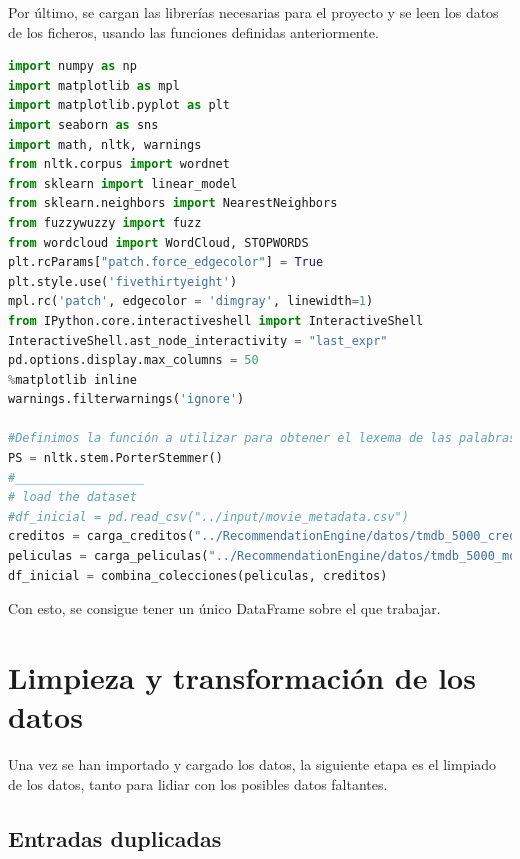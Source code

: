 Por último, se cargan las librerías necesarias para el proyecto y se leen los datos de los ficheros, usando las funciones definidas anteriormente.
\begin{lstlisting}[language=Python, caption=Código usado para la carga de los datos. Se aplican las funciones definidas anteriormente para obtener, a partir de los CSV un único dataframe, que será con el que se trabaje el resto del tiempo]
import numpy as np
import matplotlib as mpl
import matplotlib.pyplot as plt
import seaborn as sns
import math, nltk, warnings
from nltk.corpus import wordnet
from sklearn import linear_model
from sklearn.neighbors import NearestNeighbors
from fuzzywuzzy import fuzz
from wordcloud import WordCloud, STOPWORDS
plt.rcParams["patch.force_edgecolor"] = True
plt.style.use('fivethirtyeight')
mpl.rc('patch', edgecolor = 'dimgray', linewidth=1)
from IPython.core.interactiveshell import InteractiveShell
InteractiveShell.ast_node_interactivity = "last_expr"
pd.options.display.max_columns = 50
%matplotlib inline
warnings.filterwarnings('ignore')

#Definimos la función a utilizar para obtener el lexema de las palabras.
PS = nltk.stem.PorterStemmer()
#__________________
# load the dataset
#df_inicial = pd.read_csv("../input/movie_metadata.csv")
creditos = carga_creditos("../RecommendationEngine/datos/tmdb_5000_credits.csv")
peliculas = carga_peliculas("../RecommendationEngine/datos/tmdb_5000_movies.csv")
df_inicial = combina_colecciones(peliculas, creditos)
\end{lstlisting}

Con esto, se consigue tener un único DataFrame sobre el que trabajar.

\newpage
\section{Limpieza y transformación de los datos}

Una vez se han importado y cargado los datos, la siguiente etapa es el limpiado de los datos, tanto para lidiar con los posibles datos faltantes.

\subsection{Entradas duplicadas}

